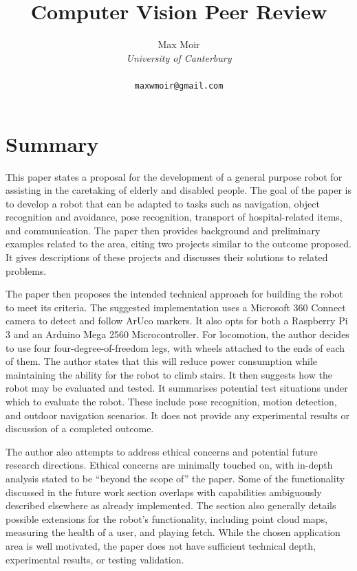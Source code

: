 \documentclass{article}
\title{ Computer Vision Peer Review }
\author{
    Max Moir \\
    \textit{University of Canterbury} \\ 
    \text{Christchurch, New Zealand} \\ 
    \texttt{maxwmoir@gmail.com}
}
\theoremstyle{definition}
\begin{document}
\maketitle

\section{Summary}


This paper states a proposal for the development of a general purpose robot for assisting in the caretaking of elderly and disabled people.
The goal of the paper is to develop a robot that can be adapted to tasks such as 
navigation, object recognition and avoidance, pose recognition, transport of hospital-related items, and communication. 
The paper then provides background and preliminary examples related to the area, 
citing two projects similar to the outcome proposed.
It gives descriptions of these projects and discusses their solutions to related problems.

The paper then proposes the intended technical approach for building the robot to meet its criteria.
The suggested implementation uses a Microsoft 360 Connect camera to detect and follow ArUco markers.
It also opts for both a Raspberry Pi 3 and an Arduino Mega 2560 Microcontroller.
For locomotion, the author decides to use four four-degree-of-freedom legs, with wheels attached to the ends of each of them.
The author states that this will reduce power consumption while maintaining the ability for the robot to climb stairs.
It then suggests how the robot may be evaluated and tested.
It summarises potential test situations under which to evaluate the robot.
These include pose recognition, motion detection, and outdoor navigation scenarios.
It does not provide any experimental results or discussion of a completed outcome.

The author also attempts to address ethical concerns and potential future research directions.
Ethical concerns are minimally touched on, with in-depth analysis stated to be ``beyond the scope of'' the paper.
Some of the functionality discussed in the future work section overlaps with capabilities ambiguously described elsewhere as already implemented.
The section also generally details possible extensions for the robot's functionality, including point cloud maps,
measuring the health of a user, and playing fetch.
While the chosen application area is well motivated, 
the paper does not have sufficient technical depth, experimental results, or testing validation.
\end{document}
